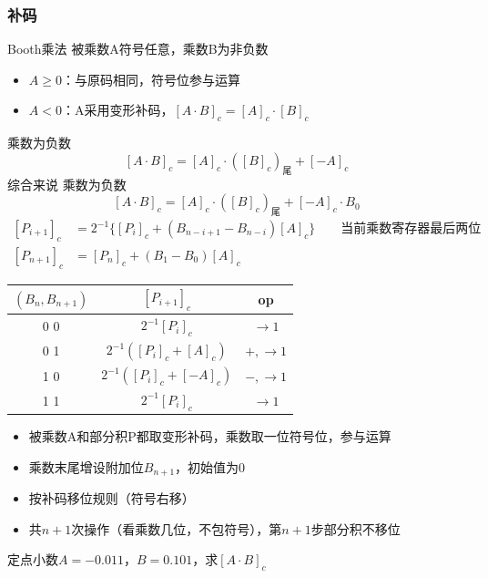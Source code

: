 \subsubsection{补码}
Booth乘法
被乘数A符号任意，乘数B为非负数
\begin{itemize}
	\item $A\geq 0$：与原码相同，符号位参与运算
	\item $A<0$：A采用变形补码，$[A\cdot B]_c=[A]_c\cdot[B]_c$
\end{itemize}
乘数为负数
\[[A\cdot B]_c=[A]_c\cdot([B]_c)_{\text{尾}}+[-A]_c\]
综合来说
乘数为负数
\[[A\cdot B]_c=[A]_c\cdot([B]_c)_{\text{尾}}+[-A]_c\cdot B_0\]
\[\begin{aligned}
[P_{i+1}]_c&=2^{-1}\{[P_i]_c+(B_{n-i+1}-B_{n-i})[A]_c\}\qquad\mbox{当前乘数寄存器最后两位}\\
[P_{n+1}]_c&=[P_n]_c+(B_1-B_0)[A]_c
\end{aligned}\]
\begin{center}
\begin{tabular}{|c|c|c|}\hline
$(B_n,B_{n+1})$ & $[P_{i+1}]_c$ & op \\\hline
0 0 & $2^{-1}[P_i]_c$ & $\to 1$ \\\hline
0 1 & $2^{-1}([P_i]_c+[A]_c)$ & $+,\to 1$ \\\hline
1 0 & $2^{-1}([P_i]_c+[-A]_c)$ & $-,\to 1$ \\\hline
1 1 & $2^{-1}[P_i]_c$ & $\to 1$ \\\hline
\end{tabular}
\end{center}
\begin{itemize}
	\item 被乘数A和部分积P都取变形补码，乘数取一位符号位，参与运算
	\item 乘数末尾增设附加位$B_{n+1}$，初始值为0
	\item 按补码移位规则（符号右移）
	\item 共$n+1$次操作（看乘数几位，不包符号），第$n+1$步部分积不移位
\end{itemize}
\begin{example}
定点小数$A=-0.011$，$B=0.101$，求$[A\cdot B]_c$
\end{example}
